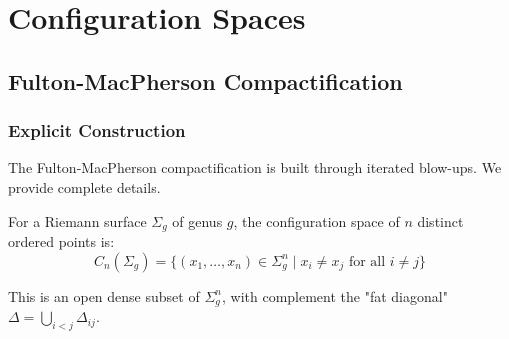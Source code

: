 \chapter{Configuration Spaces}
\section{Fulton-MacPherson Compactification}

\subsection{Explicit Construction}

The Fulton-MacPherson compactification is built through iterated blow-ups. We provide complete details.

\begin{definition}\label{def:config-space-genus-g}
For a Riemann surface $\Sigma_g$ of genus $g$, the configuration space of $n$ distinct ordered points is:
$$C_n(\Sigma_g) = \{(x_1, \ldots, x_n) \in \Sigma_g^n \mid x_i \neq x_j \text{ for all } i \neq j\}$$

This is an open dense subset of $\Sigma_g^n$, with complement the "fat diagonal" $\Delta = \bigcup_{i<j} \Delta_{ij}$.
\end{definition}

